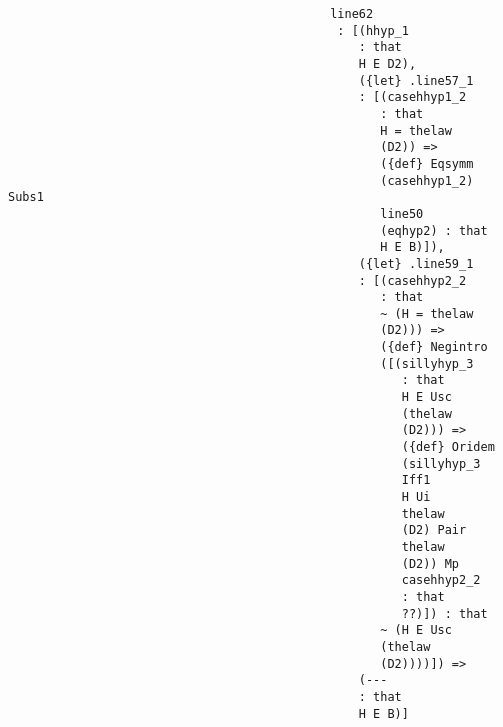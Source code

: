 \documentclass[12pt]{article}
\begin{document}
\begin{verbatim}
                                             line62 
                                              : [(hhyp_1 
                                                 : that 
                                                 H E D2), 
                                                 ({let} .line57_1 
                                                 : [(casehhyp1_2 
                                                    : that 
                                                    H = thelaw 
                                                    (D2)) => 
                                                    ({def} Eqsymm 
                                                    (casehhyp1_2) Subs1 
                                                    line50 
                                                    (eqhyp2) : that 
                                                    H E B)]), 
                                                 ({let} .line59_1 
                                                 : [(casehhyp2_2 
                                                    : that 
                                                    ~ (H = thelaw 
                                                    (D2))) => 
                                                    ({def} Negintro 
                                                    ([(sillyhyp_3 
                                                       : that 
                                                       H E Usc 
                                                       (thelaw 
                                                       (D2))) => 
                                                       ({def} Oridem 
                                                       (sillyhyp_3 
                                                       Iff1 
                                                       H Ui 
                                                       thelaw 
                                                       (D2) Pair 
                                                       thelaw 
                                                       (D2)) Mp 
                                                       casehhyp2_2 
                                                       : that 
                                                       ??)]) : that 
                                                    ~ (H E Usc 
                                                    (thelaw 
                                                    (D2))))]) => 
                                                 (--- 
                                                 : that 
                                                 H E B)]



\end{verbatim}
\end{document}
